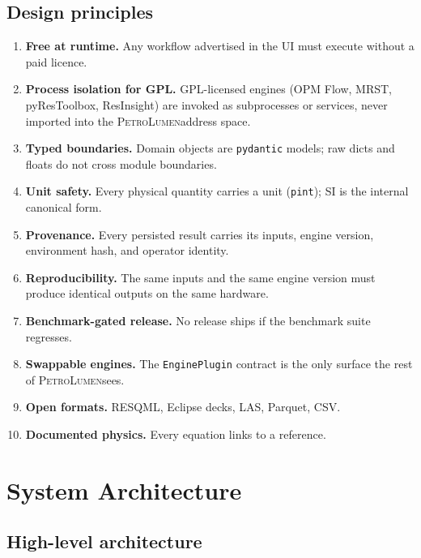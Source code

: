 \documentclass[11pt,a4paper]{article}
\newcommand{\petro}{\textsc{PetroLumen}}
\newcommand{\code}[1]{\texttt{#1}}
\begin{document}
\subsection{Design principles}

\begin{enumerate}[leftmargin=1.6em, label=\textbf{P\arabic*.}]
  \item \textbf{Free at runtime.} Any workflow advertised in the UI must execute
        without a paid licence.
  \item \textbf{Process isolation for GPL.} GPL-licensed engines
        (OPM Flow, MRST, pyResToolbox, ResInsight) are invoked as subprocesses
        or services, never imported into the \petro address space.
  \item \textbf{Typed boundaries.} Domain objects are \code{pydantic} models;
        raw dicts and floats do not cross module boundaries.
  \item \textbf{Unit safety.} Every physical quantity carries a unit
        (\code{pint}); SI is the internal canonical form.
  \item \textbf{Provenance.} Every persisted result carries its inputs, engine
        version, environment hash, and operator identity.
  \item \textbf{Reproducibility.} The same inputs and the same engine version
        must produce identical outputs on the same hardware.
  \item \textbf{Benchmark-gated release.} No release ships if the benchmark
        suite regresses.
  \item \textbf{Swappable engines.} The \code{EnginePlugin} contract is the only
        surface the rest of \petro sees.
  \item \textbf{Open formats.} RESQML, Eclipse decks, LAS, Parquet, CSV.
  \item \textbf{Documented physics.} Every equation links to a reference.
\end{enumerate}

\section{System Architecture}

\subsection{High-level architecture}
\end{document}
